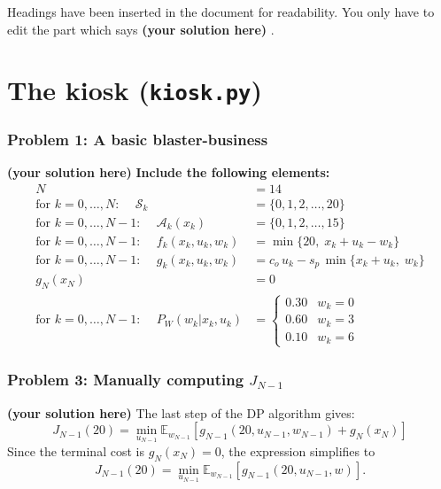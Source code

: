 \documentclass[12pt,twoside]{article}
\newcommand\redt[1]{ {\textcolor[rgb]{0.60, 0.00, 0.00}{\textbf{ #1} } } }
\newcommand{\yoursolution}{ \redt{(your solution here) } }
\begin{document}
Headings have been inserted in the document for readability. You only have to edit the part which says \yoursolution. 

\section{The kiosk (\texttt{kiosk.py})}
\subsubsection*{{\color{red}Problem 1:  A basic blaster-business}}

\yoursolution 	
\redt{Include the following elements: \begin{align}
	N & = 14 \\
	\mbox{for $k=0,\dots,N$: }\quad	\mathcal{S}_k & =  \{0,1,2,\dots,20\} \\
	\mbox{for $k=0,\dots,N-1$: }\quad \mathcal{A}_k(x_k) & = \{0,1,2,\dots,15\} \\
    \mbox{for $k=0,\dots,N-1$: }\quad f_k(x_k, u_k, w_k) & = \min\{20,\; x_k + u_k - w_k\} \\
	\mbox{for $k=0,\dots,N-1$: }\quad g_k(x_k, u_k, w_k) & = c_{o}\,u_k - s_{p}\,\min\{x_k+u_k,\; w_k\} \\
	g_N(x_N) & = 0 \\
    \mbox{for $k=0,\dots,N-1$: }\quad P_W(w_k | x_k, u_k) & = \begin{cases}
0.30 & w_k = 0 \\
0.60 & w_k = 3 \\
0.10 & w_k = 6
\end{cases}
\end{align} }

\subsubsection*{{\color{red}Problem 3:  Manually computing $J_{N-1}$}}
		
	\yoursolution The last step of the DP algorithm gives:
	$$
	J_{N-1}(20)  = \min_{u_{N-1} } \mathbb{E}_{w_{N-1}}\left[ g_{N-1}(20, u_{N-1}, w_{N-1} ) +  g_N(x_N) \right]
	$$
	Since the terminal cost is $g_N(x_N)=0$, the expression simplifies to
    $$
    J_{N-1}(20)  = \min_{u_{N-1}} \mathbb{E}_{w_{N-1}}\left[g_{N-1}(20,u_{N-1},w)\right].
    $$
    
\end{document}
